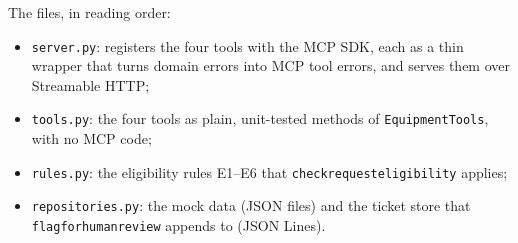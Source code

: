 \documentclass[11pt,letterpaper]{article}
\renewcommand{\_}{\textunderscore\allowbreak}
\begin{document}
The files, in reading order:

\begin{itemize}
  \item \texttt{server.py}: registers the four tools with the MCP SDK, each as a thin wrapper that turns domain errors into MCP tool errors, and serves them over Streamable HTTP;
  \item \texttt{tools.py}: the four tools as plain, unit-tested methods of \texttt{EquipmentTools}, with no MCP code;
  \item \texttt{rules.py}: the eligibility rules E1--E6 that \texttt{check\_request\_eligibility} applies;
  \item \texttt{repositories.py}: the mock data (JSON files) and the ticket store that \texttt{flag\_for\_human\_review} appends to (JSON Lines).
\end{itemize}
\end{document}
